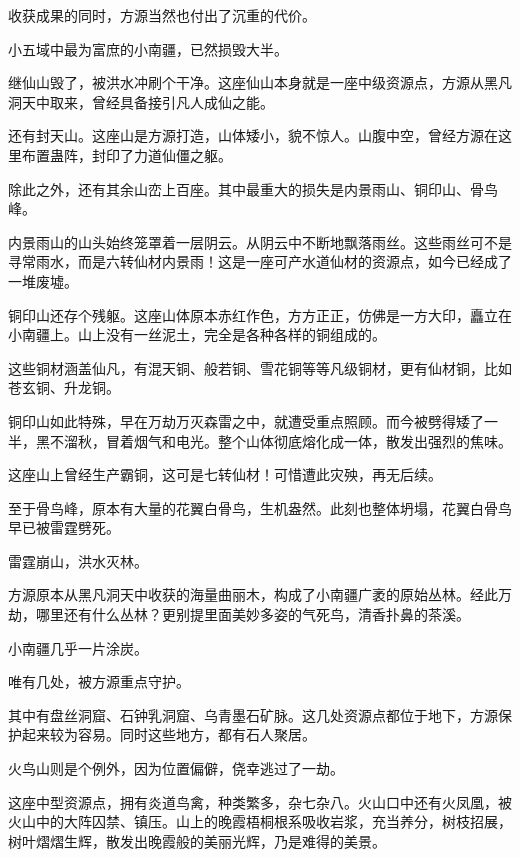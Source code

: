
\begin{this_body}

收获成果的同时，方源当然也付出了沉重的代价。

小五域中最为富庶的小南疆，已然损毁大半。

继仙山毁了，被洪水冲刷个干净。这座仙山本身就是一座中级资源点，方源从黑凡洞天中取来，曾经具备接引凡人成仙之能。

还有封天山。这座山是方源打造，山体矮小，貌不惊人。山腹中空，曾经方源在这里布置蛊阵，封印了力道仙僵之躯。

除此之外，还有其余山峦上百座。其中最重大的损失是内景雨山、铜印山、骨鸟峰。

内景雨山的山头始终笼罩着一层阴云。从阴云中不断地飘落雨丝。这些雨丝可不是寻常雨水，而是六转仙材内景雨！这是一座可产水道仙材的资源点，如今已经成了一堆废墟。

铜印山还存个残躯。这座山体原本赤红作色，方方正正，仿佛是一方大印，矗立在小南疆上。山上没有一丝泥土，完全是各种各样的铜组成的。

这些铜材涵盖仙凡，有混天铜、般若铜、雪花铜等等凡级铜材，更有仙材铜，比如苍玄铜、升龙铜。

铜印山如此特殊，早在万劫万灭森雷之中，就遭受重点照顾。而今被劈得矮了一半，黑不溜秋，冒着烟气和电光。整个山体彻底熔化成一体，散发出强烈的焦味。

这座山上曾经生产霸铜，这可是七转仙材！可惜遭此灾殃，再无后续。

至于骨鸟峰，原本有大量的花翼白骨鸟，生机盎然。此刻也整体坍塌，花翼白骨鸟早已被雷霆劈死。

雷霆崩山，洪水灭林。

方源原本从黑凡洞天中收获的海量曲丽木，构成了小南疆广袤的原始丛林。经此万劫，哪里还有什么丛林？更别提里面美妙多姿的气死鸟，清香扑鼻的茶溪。

小南疆几乎一片涂炭。

唯有几处，被方源重点守护。

其中有盘丝洞窟、石钟乳洞窟、乌青墨石矿脉。这几处资源点都位于地下，方源保护起来较为容易。同时这些地方，都有石人聚居。

火鸟山则是个例外，因为位置偏僻，侥幸逃过了一劫。

这座中型资源点，拥有炎道鸟禽，种类繁多，杂七杂八。火山口中还有火凤凰，被火山中的大阵囚禁、镇压。山上的晚霞梧桐根系吸收岩浆，充当养分，树枝招展，树叶熠熠生辉，散发出晚霞般的美丽光辉，乃是难得的美景。


\end{this_body}
